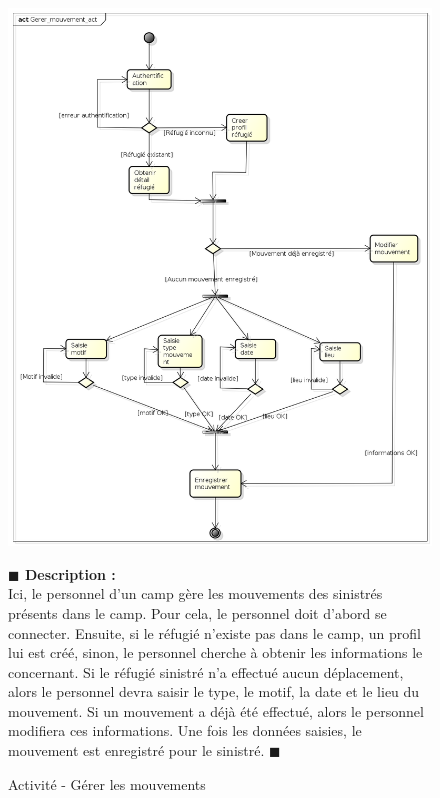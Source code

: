 \documentclass[11pt, titlepage]{report}
\newcommand{\debutDescription}{\noindent\textbf{\textcolor{DescriptionColor}{$\blacksquare$  Description : \\}}}
\newcommand{\finDescription}{\noindent\textcolor{DescriptionColor}{$\blacksquare$}}
\begin{document}
\begin{figure}[h!]
\begin{center}
\includegraphics[scale=.4]{../images/diagrammes/uml/exigence_1/act_gerer_mouvement.png} 
\caption{Activité - Gérer les mouvements}
\end{center}
\debutDescription
Ici, le personnel d'un camp gère les mouvements des sinistrés présents dans le camp. Pour cela, le personnel doit d'abord se connecter. Ensuite, si le réfugié n'existe pas dans le camp, un profil lui est créé, sinon, le personnel cherche à obtenir les informations le concernant. Si le réfugié sinistré n'a effectué aucun déplacement, alors le personnel devra saisir le type, le motif, la date et le lieu du mouvement. Si un mouvement a déjà été effectué, alors le personnel modifiera ces informations. Une fois les données saisies, le mouvement est enregistré pour le sinistré.
\finDescription
\end{figure}
\end{document}

